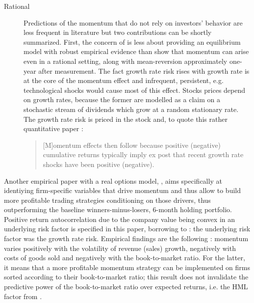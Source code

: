 \begin{description}
\item[Rational] Predictions of the momentum that do not rely on investors' behavior are less frequent in literature but two contributions can be shortly summarized. First, the concern of \textcite{Johnson2002} is less about providing an equilibrium model with robust empirical evidence than show that momentum can arise even in a rational setting, along with mean-reversion approximately one-year after measurement. The fact growth rate risk rises with growth rate is at the core of the momentum effect and infrequent, persistent, e.g. technological shocks would cause most of this effect. Stocks prices depend on growth rates, because the former are modelled as a claim on a stochastic stream of dividends which grow at a random stationary rate. The growth rate risk is priced in the stock and, to quote this rather quantitative paper :
  \begin{quote}
    [M]omentum effects then follow because positive (negative) cumulative returns typically imply ex post that recent growth rate shocks have been positive (negative).
    \end{quote}
\end{description}
Another empirical paper with a real options model, \textcite{Sagi2007}, aims specifically at identiying firm-specific variables that drive momentum and thus allow to build more profitable trading strategies conditioning on those drivers, thus outperforming the baseline \textcite{Jegadeesh1993} winners-minus-losers, 6-month holding portfolio. Positive return autocorrelation due to the company value being convex in an underlying risk factor is specified in this paper, borrowing to \textcite{Johnson2002} : the underlying risk factor was the growth rate risk. Empirical findings are the following : momentum varies positively with the volatility of revenue (sales) growth, negatively with costs of goods sold and negatively with the book-to-market ratio. For the latter, it means that a more profitable momentum strategy can be implemented on firms sorted according to their book-to-market ratio; this result does not invalidate the predictive power of the book-to-market ratio over expected returns, i.e. the HML factor from \textcite{Fama1992}.

